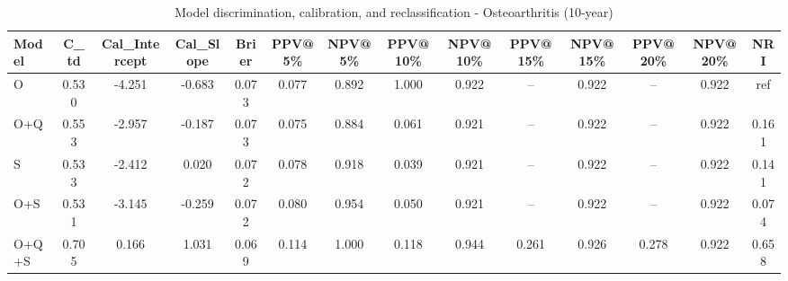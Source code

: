 \begin{table}[htbp]
\centering
\small
\caption{Model discrimination, calibration, and reclassification - Osteoarthritis (10-year)}
\label{tab:perf_osteoarthritis_10y}
\begin{tabular}{lccccccccccccc}
\toprule
Model & C\_td & Cal\_Intercept & Cal\_Slope & Brier & PPV@5\% & NPV@5\% & PPV@10\% & NPV@10\% & PPV@15\% & NPV@15\% & PPV@20\% & NPV@20\% & NRI \\
\midrule
O & 0.530 & -4.251 & -0.683 & 0.073 & 0.077 & 0.892 & 1.000 & 0.922 & -- & 0.922 & -- & 0.922 & ref \\
O+Q & 0.553 & -2.957 & -0.187 & 0.073 & 0.075 & 0.884 & 0.061 & 0.921 & -- & 0.922 & -- & 0.922 & 0.161 \\
S & 0.533 & -2.412 & 0.020 & 0.072 & 0.078 & 0.918 & 0.039 & 0.921 & -- & 0.922 & -- & 0.922 & 0.141 \\
O+S & 0.531 & -3.145 & -0.259 & 0.072 & 0.080 & 0.954 & 0.050 & 0.921 & -- & 0.922 & -- & 0.922 & 0.074 \\
O+Q+S & 0.705 & 0.166 & 1.031 & 0.069 & 0.114 & 1.000 & 0.118 & 0.944 & 0.261 & 0.926 & 0.278 & 0.922 & 0.658 \\
\bottomrule
\end{tabular}
\end{table}